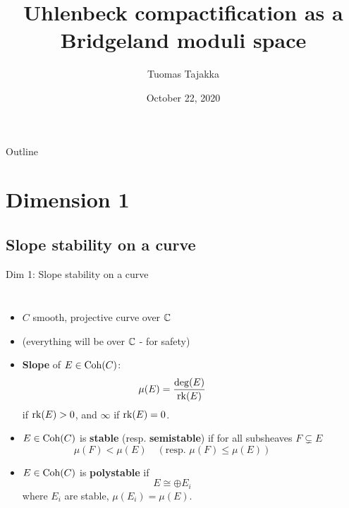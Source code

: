 \documentclass[8pt,handout]{beamer} %
\title{Uhlenbeck compactification as a Bridgeland moduli space}
\author{Tuomas Tajakka}
\institute{University of Washington}
\date{October 22, 2020}
\begin{document}
\begin{frame}
    \titlepage
\end{frame}

\begin{frame}{Outline}
    \tableofcontents    
\end{frame}

\section{Dimension 1}
\subsection{Slope stability on a curve}
\begin{frame}[fragile]{Dim 1: Slope stability on a curve}
\begin{columns}[t]
    \begin{itemize}
        \item<2-> $C$ smooth, projective curve over $\mathbb{C}$
        \item<3-> (everything will be over $\mathbb{C}$ - for safety)
        \item<4-> \textbf{Slope} of $E \in \mathrm{Coh}(C)$:
        \[ \mu(E) = \frac{\deg(E)}{\operatorname{\mathrm{rk}}(E)} \]
        if $\operatorname{\mathrm{rk}}(E) > 0$, and $\infty$ if $\operatorname{\mathrm{rk}}(E) = 0$.
        \item<5-> $E \in \mathrm{Coh}(C)$ is \textbf{stable} (resp. \textbf{semistable}) if for all subsheaves $F \subsetneq E$
        \[ \mu(F) < \mu(E) \quad (\text{resp. } \mu(F) \le \mu(E)) \]
        \item<6-> $E \in \mathrm{Coh}(C)$ is \textbf{polystable} if
        \[ E \cong \oplus E_i \]
        where $E_i$ are stable, $\mu(E_i) = \mu(E)$.
    \end{itemize}
    

\end{columns}
\end{frame}
\end{document}
